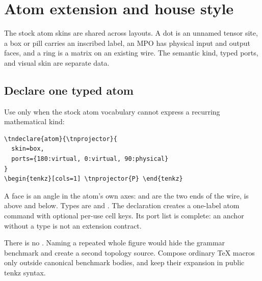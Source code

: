 \section{Atom extension and house style}\label{ch:house}

The stock atom skins are shared across layouts.  A dot is an unnamed tensor
site, a box or pill carries an inscribed label, an MPO has physical input and
output faces, and a ring is a matrix on an existing wire.  The semantic kind,
typed ports, and visual skin are separate data.

\subsection{Declare one typed atom}

Use  only when the stock atom vocabulary cannot express a
recurring mathematical kind:


\begin{Verbatim}[fontsize=\small,frame=leftline]
\tndeclare{atom}{\tnprojector}{
  skin=box,
  ports={180:virtual, 0:virtual, 90:physical}
}
\begin{tenkz}[cols=1] \tnprojector{P} \end{tenkz}
\end{Verbatim}

A face is an angle in the atom's own axes:  and  are the
two ends of the wire,  is above and  below.  Types are
 and .  The declaration creates a
one-label atom command with optional per-use cell keys.  Its port list is
complete: an anchor without a type is not an extension contract.


There is no .  Naming a repeated whole figure would hide the
grammar benchmark and create a second topology source.  Compose ordinary TeX
macros only outside canonical benchmark bodies, and keep their expansion in
public tenkz syntax.

